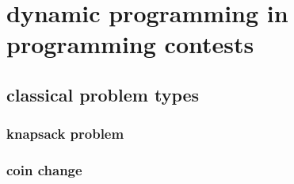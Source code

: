 \section{dynamic programming in programming contests}

\subsection{classical problem types}

\subsubsection{knapsack problem}

\subsubsection{coin change}